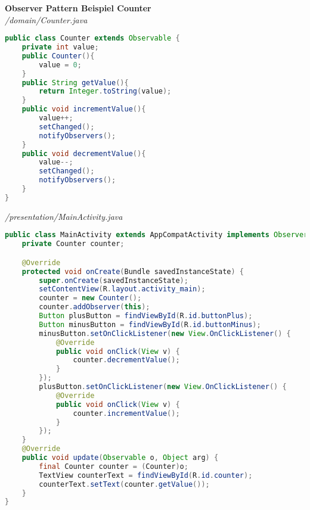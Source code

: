 \textbf{Observer Pattern Beispiel Counter} \\
\textit{/domain/Counter.java}
\begin{lstlisting}[language=java]
public class Counter extends Observable {
    private int value;
    public Counter(){
        value = 0;
    }
    public String getValue(){
        return Integer.toString(value);
    }
    public void incrementValue(){
        value++;
        setChanged();
        notifyObservers();
    }
    public void decrementValue(){
        value--;
        setChanged();
        notifyObservers();
    }
}
\end{lstlisting}
\textit{/presentation/MainActivity.java}
\begin{lstlisting}[language=java]
public class MainActivity extends AppCompatActivity implements Observer {
    private Counter counter;

    @Override
    protected void onCreate(Bundle savedInstanceState) {
        super.onCreate(savedInstanceState);
        setContentView(R.layout.activity_main);
        counter = new Counter();
        counter.addObserver(this);
        Button plusButton = findViewById(R.id.buttonPlus);
        Button minusButton = findViewById(R.id.buttonMinus);
        minusButton.setOnClickListener(new View.OnClickListener() {
            @Override
            public void onClick(View v) {
                counter.decrementValue();
            }
        });
        plusButton.setOnClickListener(new View.OnClickListener() {
            @Override
            public void onClick(View v) {
                counter.incrementValue();
            }
        });
    }
    @Override
    public void update(Observable o, Object arg) {
        final Counter counter = (Counter)o;
        TextView counterText = findViewById(R.id.counter);
        counterText.setText(counter.getValue());
    }
}
\end{lstlisting}

